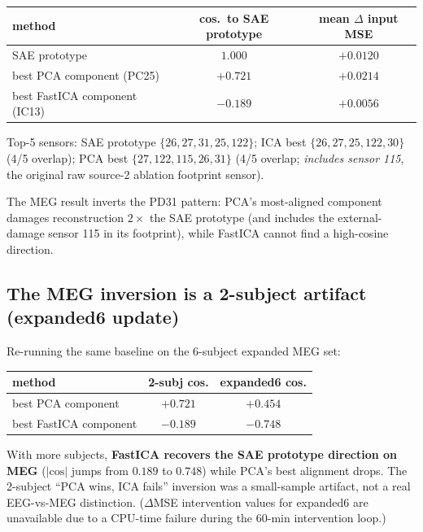 \documentclass[11pt]{article}
\newcommand{\dmse}{$\Delta$ input MSE}
\begin{document}
\begin{table}[h]
\centering
\small
\begin{tabular}{lcc}
\toprule
\textbf{method} & \textbf{cos.\ to SAE prototype} & \textbf{mean \dmse{}} \\
\midrule
SAE prototype                  & $1.000$  & $+0.0120$ \\
best PCA component (PC25)      & $+0.721$ & $\mathbf{+0.0214}$ \\
best FastICA component (IC13)  & $-0.189$ & $+0.0056$ \\
\bottomrule
\end{tabular}
\end{table}

Top-5 sensors: SAE prototype $\{26, 27, 31, 25, 122\}$; ICA best
$\{26, 27, 25, 122, 30\}$ (4/5 overlap); PCA best
$\{27, 122, 115, 26, 31\}$ (4/5 overlap; \emph{includes sensor 115}, the
original raw source-2 ablation footprint sensor).

The MEG result inverts the PD31 pattern: PCA's most-aligned component damages
reconstruction $2\times$ the SAE prototype (and includes the external-damage
sensor 115 in its footprint), while FastICA cannot find a high-cosine direction.

\subsection{The MEG inversion is a 2-subject artifact (expanded6 update)}

Re-running the same baseline on the 6-subject expanded MEG set:

\begin{table}[h]
\centering
\small
\begin{tabular}{lcc}
\toprule
\textbf{method} & \textbf{2-subj cos.} & \textbf{expanded6 cos.} \\
\midrule
best PCA component       & $+0.721$ & $+0.454$ \\
best FastICA component   & $-0.189$ & $\mathbf{-0.748}$ \\
\bottomrule
\end{tabular}
\end{table}

With more subjects, \textbf{FastICA recovers the SAE prototype direction on
MEG} ($|\mathrm{cos}|$ jumps from $0.189$ to $0.748$) while PCA's best
alignment drops. The 2-subject ``PCA wins, ICA fails'' inversion was a
small-sample artifact, not a real EEG-vs-MEG distinction. ($\Delta$MSE
intervention values for expanded6 are unavailable due to a CPU-time failure
during the 60-min intervention loop.)
\end{document}
